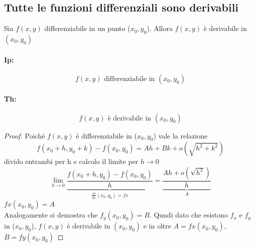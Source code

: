 \documentclass{book}
\begin{document}
\subsection{Tutte le funzioni differenziali sono derivabili}
Sia $f(x,y)$ differenziabile in un punto ($x_0,y_0$). Allora $f(x,y)$ è derivabile in
$(x_0,y_0)$
\begin{multicols}{2}
  \paragraph{Ip:}
  \begin{equation*}
    f(x,y) \text{ differenziabile in } (x_0,y_0)
  \end{equation*}
  \paragraph{Th:}
  \begin{equation*}
    f(x,y) \text{ è derivabile in } (x_0,y_0)
  \end{equation*}
\end{multicols}
\begin{proof}
  Poiché $f(x,y)$ è differenziabile in ($x_0,y_0$) vale la relazione
  \begin{equation*}
    f(x_0+h,y_0+k) - f(x_0,y_0)=Ah+Bk+o(\sqrt{h^2+k^2})
  \end{equation*}
  divido entrambi per h e calcolo il limite per $h\to 0$
  \begin{equation*}
    \lim\limits_{h \to 0}\underbrace{\frac{f(x_0+h,y_0) - f(x_0,y_0)}{h}}_{\frac{\partial f}{\partial x}(x_0,y_0)=fx}=\underbrace{\frac{Ah+o(\sqrt{h^2})}{h}}_A
  \end{equation*}
  $fx(x_0,y_0)=A$\\
  Analogamente si demostra che $f_y(x_0,y_0)=B$. Qundi dato che esistono $f_x$ e $f_y$ in ($x_0,y_0$), $f(x,y)$ è derivabile in $(x_0,y_0)$ e in oltre $A=fx(x_0,y_0)$, $B=fy(x_0,y_0)$
\end{proof}
\end{document}
